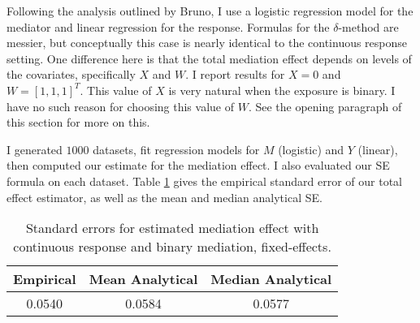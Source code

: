 \documentclass{article}
\begin{document}
Following the analysis outlined by Bruno, I use a logistic regression model for the mediator and linear regression for the response. Formulas for the $\delta$-method are messier, but conceptually this case is nearly identical to the continuous response setting. One difference here is that the total mediation effect depends on levels of the covariates, specifically $X$ and $W$. I report results for $X=0$ and $W = [1,1,1]^T$. This value of $X$ is very natural when the exposure is binary. I have no such reason for choosing this value of $W$. See the opening paragraph of this section for more on this.

I generated $1000$ datasets, fit regression models for $M$ (logistic) and $Y$ (linear), then computed our estimate for the mediation effect. I also evaluated our SE formula on each dataset. Table \ref{tab:SEs_cont_bin_fix} gives the empirical standard error of our total effect estimator, as well as the mean and median analytical SE.

\begin{table}
    \centering
    \begin{tabular}{|c|c|c|}
        \hline
        Empirical & Mean Analytical & Median Analytical\\
        \hline
        0.0540 & 0.0584 & 0.0577\\
        \hline
    \end{tabular}
    \caption{Standard errors for estimated mediation effect with continuous response and binary mediation, fixed-effects.}
    \label{tab:SEs_cont_bin_fix}
\end{table}
\end{document}
